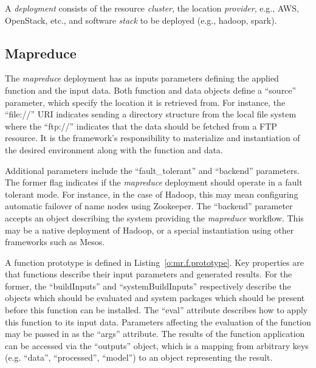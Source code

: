 \documentclass[10pt]{article}
\begin{document}
A \textit{deployment} consists of the resource \- \textit{cluster},
the location \- \textit{provider}, e.g., AWS, OpenStack, etc., and
software \textit{stack} to be deployed (e.g., hadoop, spark).


\subsection{Mapreduce}

The \textit{mapreduce} deployment has as inputs parameters defining
the applied function and the input data.  Both function and data
objects define a ``source'' parameter, which specify the location it
is retrieved from. For instance, the ``file://'' URI indicates sending
a directory structure from the local file system where the ``ftp://''
indicates that the data should be fetched from a FTP resource. It is
the framework's responsibility to materialize and instantiation of the
desired environment along with the function and data.


Additional parameters include the ``fault\_tolerant'' and ``backend''
parameters.  The former flag indicates if the \textit{mapreduce}
deployment should operate in a fault tolerant mode. For instance, in
the case of Hadoop, this may mean configuring automatic failover of
name nodes using Zookeeper.  The ``backend'' parameter accepts an
object describing the system providing the \textit{mapreduce}
workflow.  This may be a native deployment of Hadoop, or a special
instantiation using other frameworks such as Mesos.

A function prototype is defined in Listing~\ref{o:mr.f.prototype}.
Key properties are that functions describe their input parameters and
generated results. For the former, the ``buildInputs'' and
``systemBuildInputs'' respectively describe the objects which should
be evaluated and system packages which should be present before this
function can be installed. The ``eval'' attribute describes how to
apply this function to its input data. Parameters affecting the
evaluation of the function may be passed in as the ``args'' attribute.
The results of the function application can be accessed via the
``outputs'' object, which is a mapping from arbitrary keys
(e.g. ``data'', ``processed'', ``model'') to an object representing
the result.
\end{document}
